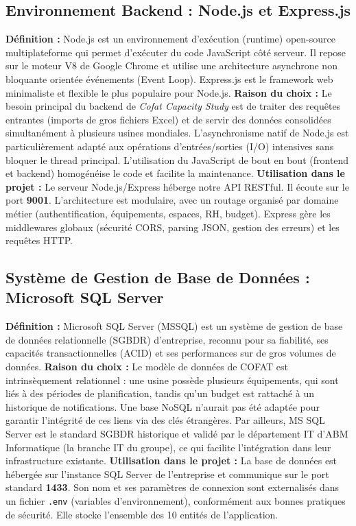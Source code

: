 \subsection{Environnement Backend : Node.js et Express.js}
\textbf{Définition :} Node.js est un environnement d'exécution (runtime) open-source multiplateforme qui permet d'exécuter du code JavaScript côté serveur. Il repose sur le moteur V8 de Google Chrome et utilise une architecture asynchrone non bloquante orientée événements (Event Loop). Express.js est le framework web minimaliste et flexible le plus populaire pour Node.js.
\newline
\textbf{Raison du choix :} Le besoin principal du backend de \textit{Cofat Capacity Study} est de traiter des requêtes entrantes (imports de gros fichiers Excel) et de servir des données consolidées simultanément à plusieurs usines mondiales. L'asynchronisme natif de Node.js est particulièrement adapté aux opérations d'entrées/sorties (I/O) intensives sans bloquer le thread principal. L'utilisation du JavaScript de bout en bout (frontend et backend) homogénéise le code et facilite la maintenance.
\newline
\textbf{Utilisation dans le projet :} Le serveur Node.js/Express héberge notre API RESTful. Il écoute sur le port \textbf{9001}. L'architecture est modulaire, avec un routage organisé par domaine métier (authentification, équipements, espaces, RH, budget). Express gère les middlewares globaux (sécurité CORS, parsing JSON, gestion des erreurs) et les requêtes HTTP.

\subsection{Système de Gestion de Base de Données : Microsoft SQL Server}
\textbf{Définition :} Microsoft SQL Server (MSSQL) est un système de gestion de base de données relationnelle (SGBDR) d'entreprise, reconnu pour sa fiabilité, ses capacités transactionnelles (ACID) et ses performances sur de gros volumes de données.
\newline
\textbf{Raison du choix :} Le modèle de données de COFAT est intrinsèquement relationnel : une usine possède plusieurs équipements, qui sont liés à des périodes de planification, tandis qu'un budget est rattaché à un historique de notifications. Une base NoSQL n'aurait pas été adaptée pour garantir l'intégrité de ces liens via des clés étrangères. Par ailleurs, MS SQL Server est le standard SGBDR historique et validé par le département IT d'ABM Informatique (la branche IT du groupe), ce qui facilite l'intégration dans leur infrastructure existante.
\newline
\textbf{Utilisation dans le projet :} La base de données est hébergée sur l'instance SQL Server de l'entreprise et communique sur le port standard \textbf{1433}. Son nom et ses paramètres de connexion sont externalisés dans un fichier \texttt{.env} (variables d'environnement), conformément aux bonnes pratiques de sécurité. Elle stocke l'ensemble des 10 entités de l'application.

